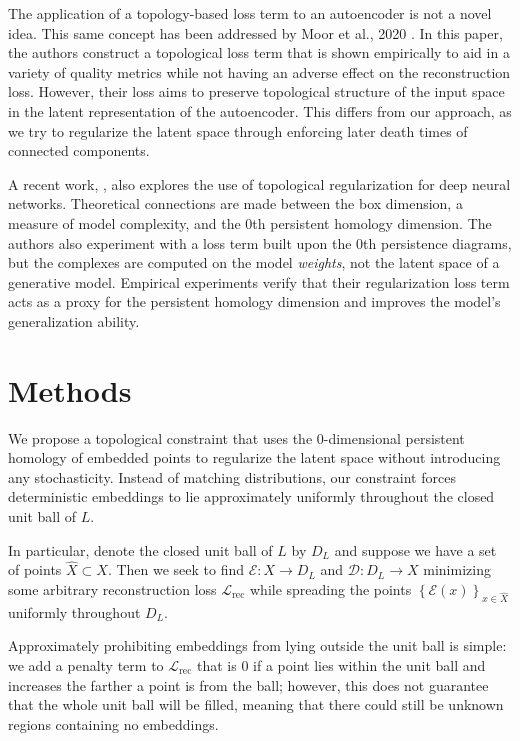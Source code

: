 \documentclass[conference]{IEEEtran}
\begin{document}
The application of a topology-based loss term to an autoencoder is not a novel idea. This same concept has been addressed by Moor et al., 2020 \cite{topo-ae}. In this paper, the authors construct a topological loss term that is shown empirically to aid in a variety of quality metrics while not having an adverse effect on the reconstruction loss. However, their loss aims to preserve topological structure of the input space in the latent representation of the autoencoder. This differs from our approach, as we try to regularize the latent space through enforcing later death times of connected components.

A recent work, \cite{birdal}, also explores the use of topological regularization for deep neural networks. Theoretical connections are made between the box dimension, a measure of model complexity, and the 0th persistent homology dimension. The authors also experiment with a loss term built upon the 0th persistence diagrams, but the complexes are computed on the model \emph{weights}, not the latent space of a generative model. Empirical experiments verify that their regularization loss term acts as a proxy for the persistent homology dimension and improves the model's generalization ability.

\section{Methods}

We propose a topological constraint that uses the 0-dimensional persistent homology of embedded points to regularize the latent space without introducing any stochasticity. Instead of matching distributions, our constraint forces deterministic embeddings to lie approximately uniformly throughout the closed unit ball of $L$.

In particular, denote the closed unit ball of $L$ by $D_{L}$ and suppose we have a set of points $\hat{X} \subset X$. Then we seek to find $\mathcal{E}:X\to D_{L}$ and $\mathcal{D}:D_{L}\to X$ minimizing some arbitrary reconstruction loss $\mathcal{L}_{\text{rec}}$ while spreading the points $\left\{ \mathcal{E}(x) \right\}_{x \in \hat{X}}$ uniformly throughout $D_{L}$.

Approximately prohibiting embeddings from lying outside the unit ball is simple: we add a penalty term to $\mathcal{L}_{\text{rec}}$ that is 0 if a point lies within the unit ball and increases the farther a point is from the ball; however, this does not guarantee that the whole unit ball will be filled, meaning that there could still be unknown regions containing no embeddings.
\end{document}
